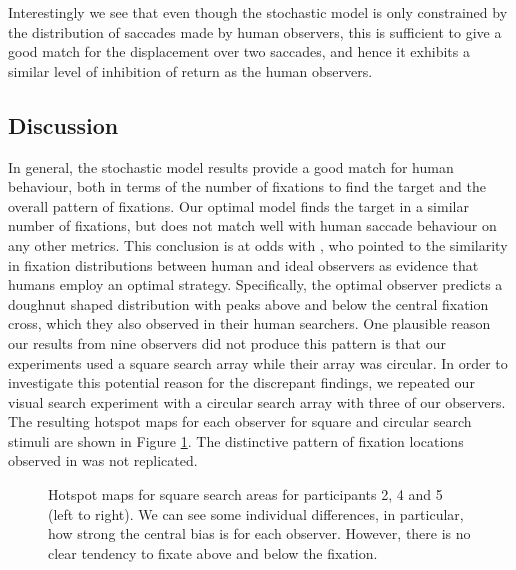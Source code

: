 \documentclass[preprint, authoryear]{elsarticle} %
\begin{document}
Interestingly we see that even though the stochastic model is only constrained by the distribution of saccades made by human observers, this is sufficient to give a good match for the displacement over two saccades, and hence it exhibits a similar level of inhibition of return as the human observers. 


\subsection{Discussion}

In general, the stochastic model results provide a good match for human behaviour, both in terms of the number of fixations to find the target and the overall pattern of fixations. Our optimal model finds the target in a similar number of fixations, but does not match well with human saccade behaviour on any other metrics. This conclusion is at odds with \cite{najemnik-geisler2008}, who pointed to the similarity in fixation distributions between human and ideal observers as evidence that humans employ an optimal strategy. Specifically, the optimal observer predicts a doughnut shaped distribution with peaks above and below the central fixation cross, which they also observed in their human searchers.  One plausible reason our results from nine observers did not produce this pattern is that our experiments used a square search array while their array was circular. In order to investigate this potential reason for the discrepant findings, we repeated our visual search experiment with a circular search array with three of our observers. The resulting hotspot maps for each observer for square and circular search stimuli are shown in Figure \ref{fig:hotspots}. The distinctive pattern of fixation locations observed in  \cite{najemnik-geisler2008} was not replicated.

\begin{figure}
	\centering
	\caption{Hotspot maps for square search areas for participants 2, 4 and 5 (left to right). We can see some individual differences, in particular, how strong the central bias is for each observer. However, there is no clear tendency to fixate above and below the fixation.} 
	\label{fig:hotspots}	
\end{figure}
\end{document}
